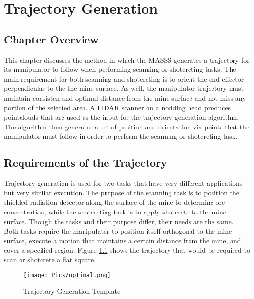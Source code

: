 \chapter{Trajectory Generation}
\label{chap:traj}
\section{Chapter Overview}
This chapter discusses the method in which the MASSS generates a trajectory for its manipulator to follow when performing scanning or shotcreting tasks. The main requirement for both scanning and shotcreting is to orient the end-effector perpendicular to the the mine surface. As well, the manipulator trajectory must maintain consisten and optimal distance from the mine surface and not miss any portion of the selected area. A LIDAR scanner on a nodding head produces pointclouds that are used as the input for the trajectory generation algorithm. The algorithm then generates a set of position and orientation via points that the manipulator must follow in order to perform the scanning or shotcreting task.\\

\section{Requirements of the Trajectory}

Trajectory generation is used for two tasks that have very different applications but very similar execution. The purpose of the scanning task is to position the shielded radiation detector along the surface of the mine to determine ore concentration, while the shotcreting task is to apply shotcrete to the mine surface. Though the tasks and their purpose differ, their needs are the same. Both tasks require the manipulator to position itself orthogonal to the mine surface, execute a motion that maintains a certain distance from the mine, and cover a specified region. Figure \ref{fig:idealspray} shows the trajectory that would be required to scan or shotcrete a flat square.\\

\begin{figure}[h]
    \centering
    \texttt{[image: Pics/optimal.png]}
    \caption{Trajectory Generation Template}
    \label{fig:idealspray}
\end{figure}

